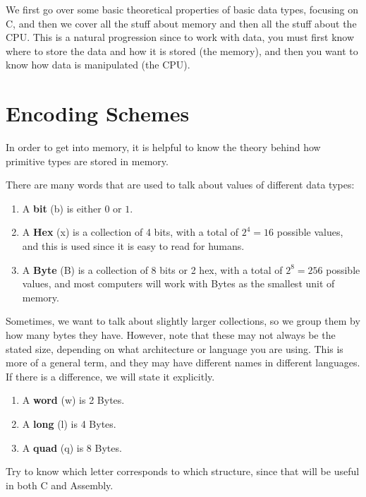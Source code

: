 \documentclass{article}
\begin{document}
We first go over some basic theoretical properties of basic data types, focusing on C, and then we cover all the stuff about memory and then all the stuff about the CPU. This is a natural progression since to work with data, you must first know where to store the data and how it is stored (the memory), and then you want to know how data is manipulated (the CPU). 

\section{Encoding Schemes}

  In order to get into memory, it is helpful to know the theory behind how primitive types are stored in memory.  

  \begin{definition}
    There are many words that are used to talk about values of different data types: 
    \begin{enumerate}
      \item A \textbf{bit} (b) is either $0$ or $1$. 
      \item A \textbf{Hex} (x) is a collection of 4 bits, with a total of $2^4 = 16$ possible values, and this is used since it is easy to read for humans. 
      \item A \textbf{Byte} (B) is a collection of 8 bits or 2 hex, with a total of $2^8 = 256$ possible values, and most computers will work with Bytes as the smallest unit of memory. 
    \end{enumerate}
  \end{definition}

  \begin{definition}
    Sometimes, we want to talk about slightly larger collections, so we group them by how many bytes they have. However, note that these may not always be the stated size, depending on what architecture or language you are using. This is more of a general term, and they may have different names in different languages. If there is a difference, we will state it explicitly. 
    \begin{enumerate}
      \item A \textbf{word} (w) is 2 Bytes. 
      \item A \textbf{long} (l) is 4 Bytes. 
      \item A \textbf{quad} (q) is 8 Bytes. 
    \end{enumerate} 
    Try to know which letter corresponds to which structure, since that will be useful in both C and Assembly. 
  \end{definition}
\end{document}
